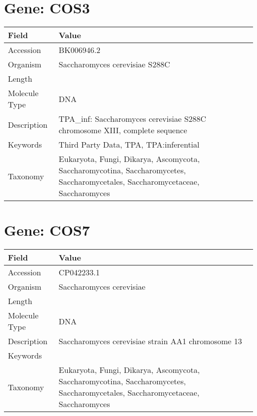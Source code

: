 \documentclass[10pt]{article}
\begin{document}
\section*{Gene: COS3}
{\footnotesize
\begin{longtable}{>{\raggedright\arraybackslash}p{4.5cm} >{\raggedright\arraybackslash}p{11.5cm}}
\textbf{Field} & \textbf{Value} \\
\hline
Accession & BK006946.2 \\
Organism & Saccharomyces cerevisiae S288C \\
Length & 924431 \\
Molecule Type & DNA \\
Description & TPA\_inf: Saccharomyces cerevisiae S288C chromosome XIII, complete sequence \\
Keywords & Third Party Data, TPA, TPA:inferential \\
Taxonomy & Eukaryota, Fungi, Dikarya, Ascomycota, Saccharomycotina, Saccharomycetes, Saccharomycetales, Saccharomycetaceae, Saccharomyces \\
\end{longtable}
}


\section*{Gene: COS7}
{\footnotesize
\begin{longtable}{>{\raggedright\arraybackslash}p{4.5cm} >{\raggedright\arraybackslash}p{11.5cm}}
\textbf{Field} & \textbf{Value} \\
\hline
Accession & CP042233.1 \\
Organism & Saccharomyces cerevisiae \\
Length & 918755 \\
Molecule Type & DNA \\
Description & Saccharomyces cerevisiae strain AA1 chromosome 13 \\
Keywords &  \\
Taxonomy & Eukaryota, Fungi, Dikarya, Ascomycota, Saccharomycotina, Saccharomycetes, Saccharomycetales, Saccharomycetaceae, Saccharomyces \\
\end{longtable}
}
\end{document}
